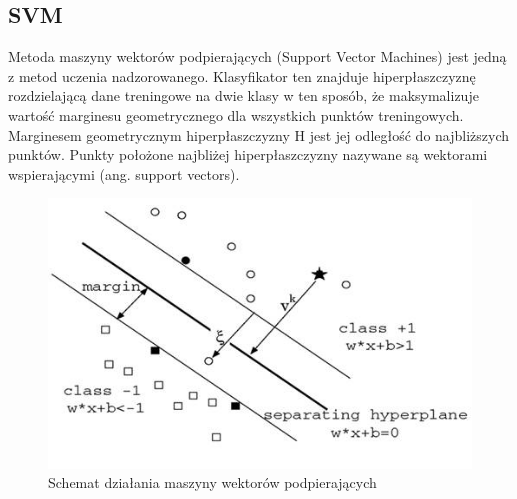 \documentclass{article}
\begin{document}
\subsection{SVM}
Metoda maszyny wektorów podpierających (Support Vector Machines) jest jedną z metod uczenia nadzorowanego. Klasyfikator ten znajduje hiperpłaszczyznę rozdzielającą dane treningowe na dwie klasy w ten sposób, że maksymalizuje wartość marginesu geometrycznego dla wszystkich punktów treningowych. Marginesem geometrycznym hiperpłaszczyzny H jest jej odległość do najbliższych punktów. Punkty położone najbliżej hiperpłaszczyzny nazywane są wektorami wspierającymi (ang. support vectors).
\begin{figure}[htp]
	\centering
	\includegraphics[width=1\textwidth]{Figures/svm.jpg}
	\caption{Schemat działania maszyny wektorów podpierających }
\end{figure}
\end{document}
